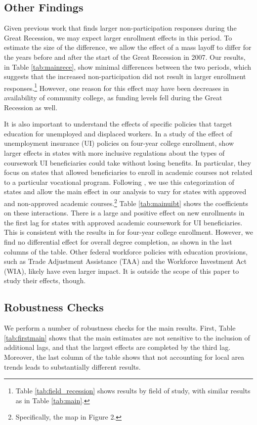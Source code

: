 \subsection{Other Findings}
Given previous work that finds larger non-participation responses during the Great Recession, we may expect larger enrollment effects in this period. To estimate the size of the difference, we allow the effect of a mass layoff to differ for the years before and after the start of the  Great Recession in 2007. Our results, in Table \ref{tab:mainrece}, show minimal differences between the two periods, which suggests that the increased non-participation did not result in larger enrollment responses.\footnote{Table \ref{tab:field_recession} shows results by field of study, with similar results as in Table \ref{tab:main}.}  However, one reason for this effect may have been decreases in availability of community college, as funding levels fell during the Great Recession as well. 

It is also important to understand the effects of specific policies that target education for unemployed and displaced workers. In a study of the effect of unemployment insurance (UI) policies on four-year college enrollment, \citet{BT2015} show larger effects in states with more inclusive regulations about the types of coursework UI beneficiaries could take without losing benefits. In particular, they focus on states that allowed beneficiaries to enroll in academic courses not related to a particular vocational program. Following \citet{BT2015}, we use this categorization of states and allow the main effect in our analysis to vary for states with approved and non-approved academic courses.\footnote{Specifically, the map in Figure 2.} Table \ref{tab:mainuibt} shows the coefficients on these interactions. There is a large and positive effect on new enrollments in the first lag for states with approved academic coursework for UI beneficiaries. This is consistent with the results in \citet{BT2015} for four-year college enrollment. However, we find no differential effect for overall degree completion, as shown in the last columns of the table. Other federal workforce policies with education provisions, such as Trade Adjustment Assistance (TAA) and the Workforce Investment Act (WIA), likely have even larger impact. It is outside the scope of this paper to study their effects, though. 

\subsection{Robustness Checks \label{sec:robchecks}}
We perform a number of robustness checks for the main results. First, Table \ref{tab:firstmain} shows that the main estimates are not sensitive to the inclusion of additional lags, and that the largest effects are completed by the third lag. Moreover, the last column of the table shows that not accounting for local area trends leads to substantially different results. 


